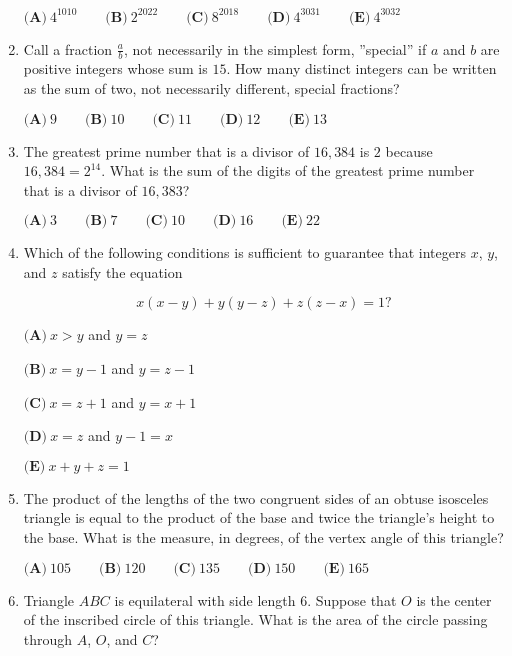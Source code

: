 \documentclass{article}
\begin{document}
\begin{enumerate}[label=\arabic*., itemsep=0.5em]
$\textbf{(A)}\: 4^{1010}\qquad\textbf{(B)} \: 2^{2022}\qquad\textbf{(C)} \: 8^{2018}\qquad\textbf{(D)} \: 4^{3031}\qquad\textbf{(E)} \: 4^{3032}$\par \vspace{0.5em}\item Call a fraction $\frac{a}{b}$, not necessarily in the simplest form, ''special'' if $a$ and $b$ are positive integers whose sum is $15$. How many distinct integers can be written as the sum of two, not necessarily different, special fractions?

$\textbf{(A)}\ 9 \qquad\textbf{(B)}\  10 \qquad\textbf{(C)}\  11 \qquad\textbf{(D)}\ 12 \qquad\textbf{(E)}\ 13$\par \vspace{0.5em}\item The greatest prime number that is a divisor of $16{,}384$ is $2$ because $16{,}384 = 2^{14}$. What is the sum of the digits of the greatest prime number that is a divisor of $16{,}383$?

$\textbf{(A)} \: 3\qquad\textbf{(B)} \: 7\qquad\textbf{(C)} \: 10\qquad\textbf{(D)} \: 16\qquad\textbf{(E)} \: 22$\par \vspace{0.5em}\item Which of the following conditions is sufficient to guarantee that integers $x$, $y$, and $z$ satisfy the equation

\begin{equation*}
x(x-y)+y(y-z)+z(z-x) = 1?
\end{equation*}


$\textbf{(A)} \: x>y$ and $y=z$

$\textbf{(B)} \: x=y-1$ and $y=z-1$

$\textbf{(C)} \: x=z+1$ and $y=x+1$

$\textbf{(D)} \: x=z$ and $y-1=x$

$\textbf{(E)} \: x+y+z=1$\par \vspace{0.5em}\item The product of the lengths of the two congruent sides of an obtuse isosceles triangle is equal to the product of the base and twice the triangle's height to the base. What is the measure, in degrees, of the vertex angle of this triangle?

$\textbf{(A)} \: 105 \qquad\textbf{(B)} \: 120 \qquad\textbf{(C)} \: 135 \qquad\textbf{(D)} \: 150 \qquad\textbf{(E)} \: 165$\par \vspace{0.5em}\item Triangle $ABC$ is equilateral with side length $6$. Suppose that $O$ is the center of the inscribed
circle of this triangle. What is the area of the circle passing through $A$, $O$, and $C$?


\end{enumerate}
\end{document}
